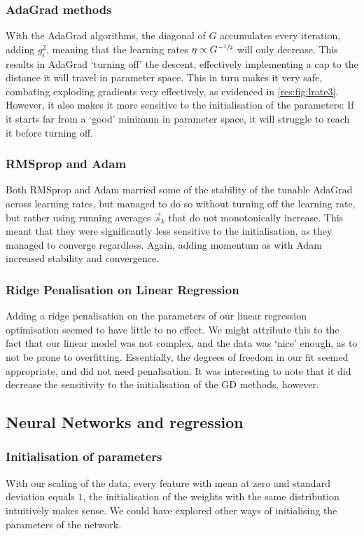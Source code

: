     \subsubsection{AdaGrad methods}
        With the AdaGrad algorithms, the diagonal of $G$ accumulates every iteration, adding $g_i^2$, meaning that the learning rates $\eta \propto G^{-\sfrac{1}{2}}$ will only decrease. This results in AdaGrad `turning off' the descent, effectively implementing a cap to the distance it will travel in parameter space. This in turn makes it very safe, combating exploding gradients very effectively, as evidenced in \cref{res:fig:lrate3}. However, it also makes it more sensitive to the initialisation of the parameters: If it starts far from a `good' minimum in parameter space, it will struggle to reach it before turning off.

    \subsubsection{RMSprop and Adam}
        Both RMSprop and Adam married some of the stability of the tunable AdaGrad across learning rates, but managed to do so without turning off the learning rate, but rather using running averages $\vec{s}_k$ that do not monotonically increase. This meant that they were significantly less sensitive to the initialisation, as they managed to converge regardless. Again, adding momentum as with Adam increased stability and convergence. 

        
        \subsubsection{Ridge Penalisation on Linear Regression}
        Adding a ridge penalisation on the parameters of our linear regression optimisation seemed to have little to no effect. We might attribute this to the fact that our linear model was not complex, and the data was `nice' enough, as to not be prone to overfitting. Essentially, the degrees of freedom in our fit seemed appropriate, and did not need penalisation. It was interesting to note that it did decrease the sensitivity to the initialisation of the GD methods, however.

    \subsection{Neural Networks and regression}
        \subsubsection{Initialisation of parameters}
            With our scaling of the data, every feature with mean at zero and standard deviation equals $1$, the initialisation of the weights with the same distribution intuitively makes sense. 
            We could have explored other ways of initialising the parameters of the network. 
    

